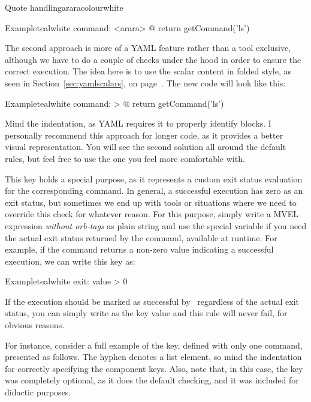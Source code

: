 \begin{description}
\begin{description}
\begin{messagebox}{Quote handling}{araracolour}{\icinfo}{white}
\begin{codebox}{Example}{teal}{\icnote}{white}
command: <arara> @{ return getCommand('ls') }
\end{codebox}

The second approach is more of a \gls{YAML} feature rather than a tool exclusive, although we have to do a couple of checks under the hood in order to ensure the correct execution. The idea here is to use the scalar content in folded style, as seen in Section~\ref{sec:yamlscalars}, on page~\pageref{sec:yamlscalars}. The new code will look like this:

\begin{codebox}{Example}{teal}{\icnote}{white}
command: >
  @{
    return getCommand('ls')
  }
\end{codebox}

Mind the indentation, as \gls{YAML} requires it to properly identify blocks. I personally recommend this approach for longer code, as it provides a better visual representation. You will see the second solution all around the default rules, but feel free to use the one you feel more comfortable with.
\end{messagebox}

\item[\describecontext{O}{commands}{exit}] This key holds a special purpose, as it represents a custom exit status evaluation for the corresponding command. In general, a successful execution has zero as an exit status, but sometimes we end up with tools or situations where we need to override this check for whatever reason. For this purpose, simply write a \gls{MVEL} expression \emph{without \glspl{orb-tag}} as plain string and use the special variable  if you need the actual exit status returned by the command, available at runtime. For example, if the command returns a non-zero value indicating a successful execution, we can write this key as:

\begin{codebox}{Example}{teal}{\icnote}{white}
exit: value > 0
\end{codebox}

If the execution should be marked as successful by \arara\ regardless of the actual exit status, you can simply write  as the key value and this rule will never fail, for obvious reasons.
\end{description}

For instance, consider a full example of the  key, defined with only one command, presented as follows. The hyphen denotes a list element, so mind the indentation for correctly specifying the component keys. Also, note that, in this case, the  key was completely optional, as it does the default checking, and it was included for didactic purposes.


\end{description}
